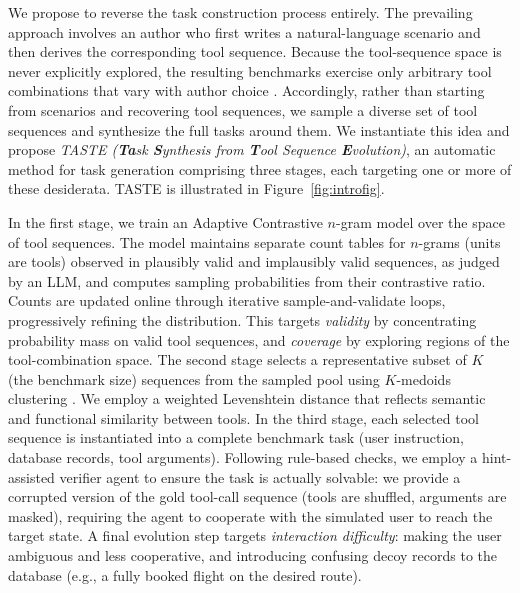 

We propose to reverse the task construction process entirely. The prevailing approach involves an author who first writes a natural-language scenario and then derives the corresponding tool sequence. Because the tool-sequence space is never explicitly explored, the resulting benchmarks exercise only arbitrary tool combinations that vary with author choice \citep{Mohammadi_survery_2025}. Accordingly, rather than starting from scenarios and recovering tool sequences, we sample a diverse set of tool sequences and synthesize the full tasks around them. We instantiate this idea and propose \emph{TASTE (\textbf{Ta}sk \textbf{S}ynthesis from \textbf{T}ool Sequence \textbf{E}volution)}, an automatic method for task generation comprising three stages, each targeting one or more of these desiderata. TASTE is illustrated in Figure~\ref{fig:introfig}. 

In the first stage, we train an Adaptive Contrastive $n$-gram model over the space of tool sequences. The model maintains separate count tables for $n$-grams (units are tools) observed in plausibly valid and implausibly valid sequences, as judged by an LLM, and computes sampling probabilities from their contrastive ratio. Counts are updated online through iterative sample-and-validate loops, progressively refining the distribution. This targets \emph{validity} by concentrating probability mass on valid tool sequences, and \emph{coverage} by exploring regions of the tool-combination space.
The second stage selects a representative subset of $K$ (the benchmark size) sequences from the sampled pool using $K$-medoids clustering \citep{kmedoids}. We employ a weighted Levenshtein distance that reflects semantic and functional similarity between tools.
In the third stage, each selected tool sequence is instantiated into a complete benchmark task (user instruction, database records, tool arguments).
Following rule-based checks, we employ a hint-assisted verifier agent to ensure the task is actually solvable: we provide a corrupted version of the gold tool-call sequence (tools are shuffled, arguments are masked), requiring the agent to cooperate with the simulated user to reach the target state. 
A final evolution step targets \emph{interaction difficulty}: making the user ambiguous and less cooperative, and introducing confusing decoy records to the database (e.g., a fully booked flight on the desired route).

